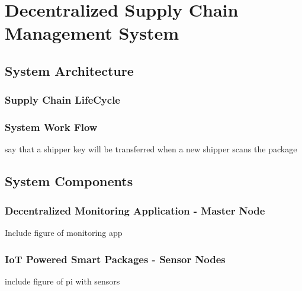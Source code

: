 \section{Decentralized Supply Chain Management System}
\subsection{System Architecture}
\subsubsection{Supply Chain LifeCycle}
\subsubsection{System Work Flow}
say that a shipper key will be transferred when a new shipper scans the package
\subsection{System Components}
\subsubsection{Decentralized Monitoring Application - Master Node}
Include figure of monitoring app
\subsubsection{IoT Powered Smart Packages - Sensor Nodes}
include figure of pi with sensors